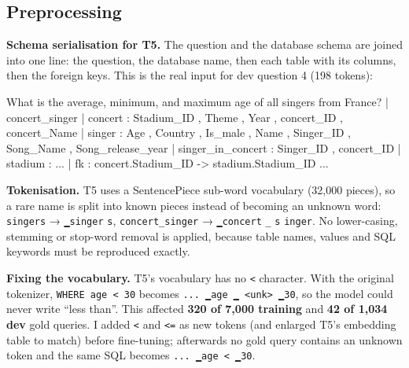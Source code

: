 \documentclass[
  10pt,
]{article}
\newenvironment{Shaded}{}{}
\newcommand{\NormalTok}[1]{#1}
\begin{document}
\subsection{Preprocessing}\label{preprocessing}

\textbf{Schema serialisation for T5.} The question and the database
schema are joined into one line: the question, the database name, then
each table with its columns, then the foreign keys. This is the real
input for dev question 4 (198 tokens):

\begin{Shaded}
\begin{Highlighting}[]
\NormalTok{What is the average, minimum, and maximum age of all singers from France? | concert\_singer}
\NormalTok{| concert : Stadium\_ID , Theme , Year , concert\_ID , concert\_Name}
\NormalTok{| singer : Age , Country , Is\_male , Name , Singer\_ID , Song\_Name , Song\_release\_year}
\NormalTok{| singer\_in\_concert : Singer\_ID , concert\_ID | stadium : ... | fk : concert.Stadium\_ID {-}\textgreater{} stadium.Stadium\_ID ...}
\end{Highlighting}
\end{Shaded}

\textbf{Tokenisation.} T5 uses a SentencePiece sub-word vocabulary
(32,000 pieces), so a rare name is split into known pieces instead of
becoming an unknown word: \texttt{singers} → \texttt{▁singer}
\texttt{s}, \texttt{concert\_singer} → \texttt{▁concert} \texttt{\_}
\texttt{s} \texttt{inger}. No lower-casing, stemming or stop-word
removal is applied, because table names, values and SQL keywords must be
reproduced exactly.

\textbf{Fixing the vocabulary.} T5's vocabulary has no
\texttt{\textless{}} character. With the original tokenizer,
\texttt{WHERE\ age\ \textless{}\ 30} becomes
\texttt{...\ ▁age\ ▁\ \textless{}unk\textgreater{}\ ▁30}, so the model
could never write ``less than''. This affected \textbf{320 of 7,000
training} and \textbf{42 of 1,034 dev} gold queries. I added
\texttt{\textless{}} and \texttt{\textless{}=} as new tokens (and
enlarged T5's embedding table to match) before fine-tuning; afterwards
no gold query contains an unknown token and the same SQL becomes
\texttt{...\ ▁age\ \textless{}\ ▁30}.
\end{document}
